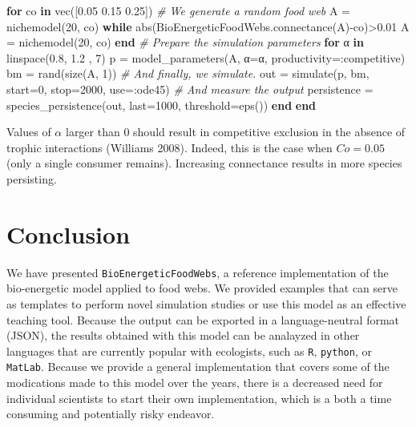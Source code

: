 \documentclass[12pt]{article}
\newenvironment{Shaded}{}{}
\newcommand{\KeywordTok}[1]{{\textbf{{#1}}}}
\newcommand{\FloatTok}[1]{{{#1}}}
\newcommand{\CommentTok}[1]{\textcolor[rgb]{0.38,0.63,0.69}{\textit{{#1}}}}
\newcommand{\NormalTok}[1]{{#1}}
\begin{document}
\begin{Shaded}
\begin{Highlighting}[]
\KeywordTok{for} \NormalTok{co }\KeywordTok{in} \NormalTok{vec([}\FloatTok{0.05} \FloatTok{0.15} \FloatTok{0.25}\NormalTok{])}
  \CommentTok{# We generate a random food web}
  \NormalTok{A = nichemodel(}\FloatTok{20}\NormalTok{, co)}
  \KeywordTok{while} \NormalTok{abs(BioEnergeticFoodWebs.connectance(A)-co)>}\FloatTok{0.01}
      \NormalTok{A = nichemodel(}\FloatTok{20}\NormalTok{, co)}
  \KeywordTok{end}
  \CommentTok{# Prepare the simulation parameters}
  \KeywordTok{for} \NormalTok{α }\KeywordTok{in} \NormalTok{linspace(}\FloatTok{0.8}\NormalTok{, }\FloatTok{1.2} \NormalTok{, }\FloatTok{7}\NormalTok{)}
    \NormalTok{p = model_parameters(A, α=α,}
    \NormalTok{productivity=:competitive)}
    \NormalTok{bm = rand(size(A, }\FloatTok{1}\NormalTok{))}
    \CommentTok{# And finally, we simulate.}
    \NormalTok{out = simulate(p, bm, start=}\FloatTok{0}\NormalTok{,}
          \NormalTok{stop=}\FloatTok{2000}\NormalTok{, use=:ode45)}
    \CommentTok{# And measure the output}
    \NormalTok{persistence = species_persistence(out,}
                  \NormalTok{last=}\FloatTok{1000}\NormalTok{,}
                  \NormalTok{threshold=eps())}
  \KeywordTok{end}
\KeywordTok{end}
\end{Highlighting}
\end{Shaded}

Values of \(\alpha\) larger than 0 should result in competitive
exclusion in the absence of trophic interactions (Williams 2008).
Indeed, this is the case when \(Co =  0.05\) (only a single consumer
remains). Increasing connectance results in more species persisting.

\section{Conclusion}\label{conclusion}

We have presented \texttt{BioEnergeticFoodWebs}, a reference
implementation of the bio-energetic model applied to food webs. We
provided examples that can serve as templates to perform novel
simulation studies or use this model as an effective teaching tool.
Because the output can be exported in a language-neutral format (JSON),
the results obtained with this model can be analayzed in other languages
that are currently popular with ecologists, such as \texttt{R},
\texttt{python}, or \texttt{MatLab}. Because we provide a general
implementation that covers some of the modications made to this model
over the years, there is a decreased need for individual scientists to
start their own implementation, which is a both a time consuming and
potentially risky endeavor.
\end{document}
